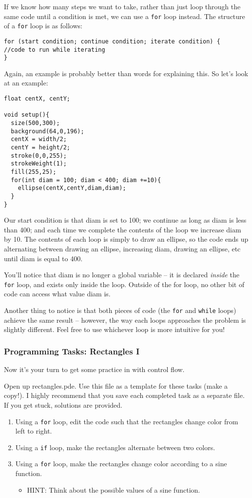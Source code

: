 If we know how many steps we want to take, rather than just loop through the same code until a condition is met, we can use a \texttt{for} loop instead.  The structure of a \texttt{for} loop is as follows:

\begin{verbatim}
for (start condition; continue condition; iterate condition) {
//code to run while iterating
}
\end{verbatim}

Again, an example is probably better than words for explaining this.  So let's look at an example:

\begin{verbatim}
float centX, centY;

void setup(){
  size(500,300);
  background(64,0,196);
  centX = width/2;
  centY = height/2;
  stroke(0,0,255);
  strokeWeight(1);
  fill(255,25);
  for(int diam = 100; diam < 400; diam +=10){
    ellipse(centX,centY,diam,diam);
  }
}
\end{verbatim}

Our start condition is that diam is set to 100; we continue as long as diam is less than 400; and each time we complete the contents of the loop we increase diam by 10.  The contents of each loop is simply to draw an ellipse, so the code ends up alternating between drawing an ellipse, increasing diam, drawing an ellipse, etc until diam is equal to 400.

You'll notice that diam is no longer a global variable -- it is declared \emph{inside} the \texttt{for} loop, and exists only inside the loop.  Outside of the for loop, no other bit of code can access what value diam is.

Another thing to notice is that both pieces of code (the \texttt{for} and \texttt{while} loops) achieve the same result -- however, the way each loops approaches the problem is slightly different.  Feel free to use whichever loop is more intuitive for you!

\subsubsection{Programming Tasks: Rectangles I}
Now it's your turn to get some practice in with control flow.

Open up rectangles.pde.  Use this file as a template for these tasks (make a copy!).  I highly recommend that you save each completed task as a separate file.  If you get stuck, solutions are provided.

\begin{enumerate}
\item Using a \texttt{for} loop, edit the code such that the rectangles change color from left to right.
\item Using a \texttt{if} loop, make the rectangles alternate between two colors.
\item Using a \texttt{for} loop, make the rectangles change color according to a sine function.
\begin{itemize}
\item HINT: Think about the possible values of a sine function.
\end{itemize}
\end{enumerate}


